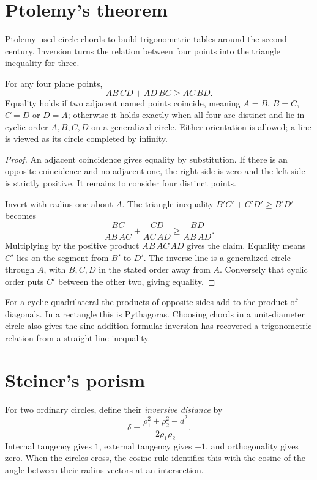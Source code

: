 \section{Ptolemy's theorem}

Ptolemy used circle chords to build trigonometric tables around the second century. Inversion turns the relation between four points into the triangle inequality for three.

\begin{theorem}\label{geometry:thm:ptolemy}
For any four plane points,
\[
AB\,CD+AD\,BC\ge AC\,BD.
\]
Equality holds if two adjacent named points coincide, meaning $A=B$, $B=C$, $C=D$ or $D=A$; otherwise it holds exactly when all four are distinct and lie in cyclic order $A,B,C,D$ on a generalized circle. Either orientation is allowed; a line is viewed as its circle completed by infinity.
\end{theorem}
\begin{proof}
An adjacent coincidence gives equality by substitution. If there is an opposite coincidence and no adjacent one, the right side is zero and the left side is strictly positive. It remains to consider four distinct points.

Invert with radius one about $A$. The triangle inequality $B'C'+C'D'\ge B'D'$ becomes
\[
\frac{BC}{AB\,AC}+\frac{CD}{AC\,AD}\ge\frac{BD}{AB\,AD}.
\]
Multiplying by the positive product $AB\,AC\,AD$ gives the claim. Equality means $C'$ lies on the segment from $B'$ to $D'$. The inverse line is a generalized circle through $A$, with $B,C,D$ in the stated order away from $A$. Conversely that cyclic order puts $C'$ between the other two, giving equality.
\end{proof}

For a cyclic quadrilateral the products of opposite sides add to the product of diagonals. In a rectangle this is Pythagoras. Choosing chords in a unit-diameter circle also gives the sine addition formula: inversion has recovered a trigonometric relation from a straight-line inequality.

\section{Steiner's porism}

For two ordinary circles, define their \emph{inversive distance} by
\[
\delta=\frac{\rho_1^2+\rho_2^2-d^2}{2\rho_1\rho_2}.
\]
Internal tangency gives $1$, external tangency gives $-1$, and orthogonality gives zero. When the circles cross, the cosine rule identifies this with the cosine of the angle between their radius vectors at an intersection.

